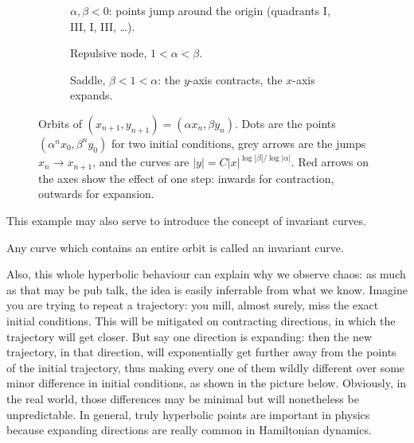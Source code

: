 \begin{example}
\begin{figure}[ht]
    \vspace{1em}

    \begin{subfigure}[t]{0.32\textwidth}
        \centering
        \caption{$\alpha,\beta<0$: points jump around the origin (quadrants I, III, I, III, \dots).}
    \end{subfigure}\hfill
    \begin{subfigure}[t]{0.32\textwidth}
        \centering
        \caption{Repulsive node, $1<\alpha<\beta$.}
    \end{subfigure}\hfill
    \begin{subfigure}[t]{0.32\textwidth}
        \centering
        \caption{Saddle, $\beta<1<\alpha$: the $y$-axis contracts, the $x$-axis expands.}
    \end{subfigure}
    \caption{Orbits of $(x_{n+1},y_{n+1})=(\alpha x_n,\beta y_n)$. Dots are the points
    $(\alpha^n x_0,\beta^n y_0)$ for two initial conditions, grey arrows are the jumps $x_n\to x_{n+1}$, and the curves are $|y|=C|x|^{\log|\beta|/\log|\alpha|}$. Red arrows on the axes show the effect of one step: inwards for contraction, outwards for expansion.}
    \label{fig:diagonal_maps}
\end{figure}
\end{example}

This example may also serve to introduce the concept of invariant curves.
\begin{definition}
    Any curve which contains an entire orbit is called an invariant curve. 
\end{definition}

Also, this whole hyperbolic behaviour can explain why we observe chaos: as much as that may be pub talk, the idea is easily inferrable from what we know. Imagine you are trying to repeat a trajectory: you mill, almost surely, miss the exact initial conditions. This will be mitigated on contracting directions, in which the trajectory will get closer. But say one direction is expanding: then the new trajectory, in that direction, will exponentially get further away from the points of the initial trajectory, thus making every one of them wildly different over some minor difference in initial conditions, as shown in the picture below. Obviously, in the real world, those differences may be minimal but will nonetheless be unpredictable. In general, truly hyperbolic points are important in physics because expanding directions are really common in Hamiltonian dynamics.


